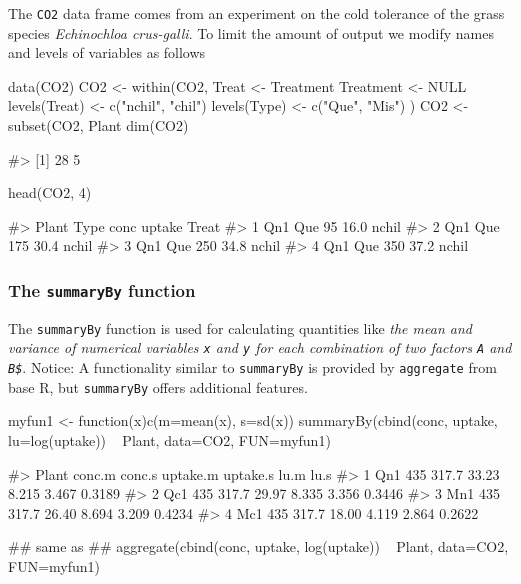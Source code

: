 The \texttt{CO2} data frame comes from an experiment on the cold
tolerance of the grass species \emph{Echinochloa crus-galli}. To limit
the amount of output we modify names and levels of variables as follows

\begin{Schunk}
\begin{Sinput}
data(CO2)
CO2 <- within(CO2, {
    Treat <- Treatment
    Treatment <- NULL
    levels(Treat) <- c("nchil", "chil")
    levels(Type)  <- c("Que", "Mis")
})
CO2 <- subset(CO2, Plant %
dim(CO2)
\end{Sinput}
\begin{Soutput}
#> [1] 28  5
\end{Soutput}
\begin{Sinput}
head(CO2, 4)
\end{Sinput}
\begin{Soutput}
#>   Plant Type conc uptake Treat
#> 1   Qn1  Que   95   16.0 nchil
#> 2   Qn1  Que  175   30.4 nchil
#> 3   Qn1  Que  250   34.8 nchil
#> 4   Qn1  Que  350   37.2 nchil
\end{Soutput}
\end{Schunk}

\hypertarget{the-summaryby-function}{%
\subsubsection{\texorpdfstring{The \texttt{summaryBy}
function}{The summaryBy function}}\label{the-summaryby-function}}

The \texttt{summaryBy} function is used for calculating quantities like
\emph{the mean and variance of numerical variables \texttt{x} and
\texttt{y} for each combination of two factors \texttt{A} and
\texttt{B\$}}. Notice: A functionality similar to \texttt{summaryBy} is
provided by \texttt{aggregate} from base R, but \texttt{summaryBy}
offers additional features.

\begin{Schunk}
\begin{Sinput}
myfun1 <- function(x){c(m=mean(x), s=sd(x))}
summaryBy(cbind(conc, uptake, lu=log(uptake)) ~ Plant, data=CO2, FUN=myfun1)
\end{Sinput}
\begin{Soutput}
#>   Plant conc.m conc.s uptake.m uptake.s  lu.m   lu.s
#> 1   Qn1    435  317.7    33.23    8.215 3.467 0.3189
#> 2   Qc1    435  317.7    29.97    8.335 3.356 0.3446
#> 3   Mn1    435  317.7    26.40    8.694 3.209 0.4234
#> 4   Mc1    435  317.7    18.00    4.119 2.864 0.2622
\end{Soutput}
\begin{Sinput}
## same as
## aggregate(cbind(conc, uptake, log(uptake)) ~ Plant, data=CO2, FUN=myfun1)
\end{Sinput}
\end{Schunk}

